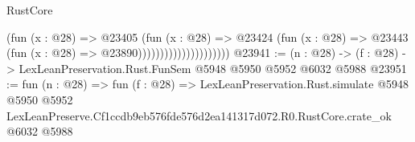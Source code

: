 \begin{lexlean}{RustCore}
\begin{coremodule}
                                      (fun (x : @28) =>
                                      @23405
                                        (fun (x : @28) =>
                                        @23424
                                          (fun (x : @28) =>
                                          @23443 (fun (x : @28) => @23890)))))))))))))))))))))
@23941 := (n : @28) -> (f : @28) -> LexLeanPreservation.Rust.FunSem @5948 @5950 @5952 @6032 @5988
@23951 := fun (n : @28) =>
  fun (f : @28) =>
  LexLeanPreservation.Rust.simulate
    @5948
    @5950
    @5952
    LexLeanPreserve.Cf1ccdb9eb576fde576d2ea141317d072.R0.RustCore.crate_ok
    @6032
    @5988
\end{coremodule}
\end{lexlean}
